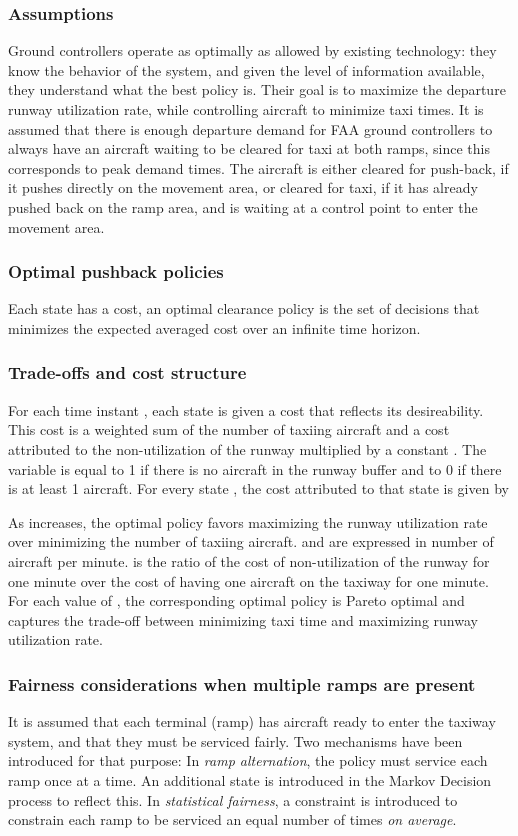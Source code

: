 \documentclass[letterpaper]{article}
\begin{document}
\subsubsection{Assumptions}
Ground controllers operate as optimally as allowed by existing technology: they know the behavior of the system, and given the level of information available, they understand what the best policy is. Their goal is to maximize the departure runway utilization rate, while controlling aircraft to minimize taxi times. It is assumed that there is enough departure demand for FAA ground controllers to always have an aircraft waiting to be cleared for taxi at both ramps, since this corresponds to peak demand times. The aircraft is either cleared for push-back, if it pushes directly on the movement area, or cleared for taxi, if it has already pushed back on the ramp area, and is waiting at a control point to enter the movement area.

\subsubsection{Optimal pushback policies}
 Each state has a cost, an optimal clearance policy is the set of decisions that minimizes the expected averaged cost over an infinite time horizon.

\subsubsection{Trade-offs and cost structure}
For each time instant , each state  is given a cost  that reflects its desireability. This cost is a weighted sum of the number of taxiing aircraft   and a cost attributed to the non-utilization of the runway  multiplied by a constant . The variable  is equal to 1 if there is no aircraft in the runway buffer and to 0 if there is at least 1 aircraft.
 For every state , the cost  attributed to that state is given by
 

As  increases, the optimal policy favors maximizing the runway utilization rate over minimizing the number of taxiing aircraft.  and  are expressed in number of aircraft per minute.  is the ratio of the cost of non-utilization of the runway for one minute over the cost of having one aircraft on the taxiway for one minute.\\
For each value of , the corresponding optimal policy is Pareto optimal and captures the trade-off between minimizing taxi time
 and maximizing runway utilization rate. 
 
\subsubsection{Fairness considerations when multiple ramps are present}
It is assumed that each terminal (ramp) has aircraft ready to enter the taxiway system, and that they must be serviced fairly. Two mechanisms have been introduced for that purpose: In {\em ramp alternation}, the policy must service each ramp once at a time. An additional state is introduced in the Markov Decision process to reflect this. In {\em statistical fairness}, a constraint is introduced to constrain each ramp to be serviced an equal number of times {\em on average}.
\end{document}
